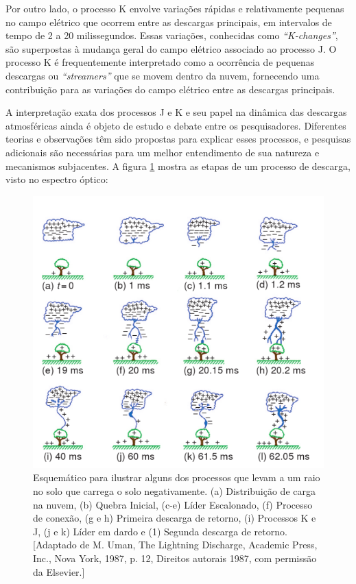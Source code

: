 \documentclass[a4paper, 12pt, onecolumn,singlespacing]{article}
\begin{document}
	Por outro lado, o processo K envolve variações rápidas e relativamente pequenas no campo elétrico que ocorrem entre as descargas principais, em intervalos de tempo de 2 a 20 milissegundos. Essas variações, conhecidas como \textit{``K-changes''}, são superpostas à mudança geral do campo elétrico associado ao processo J. O processo K é frequentemente interpretado como a ocorrência de pequenas descargas ou \textit{``streamers''} que se movem dentro da nuvem, fornecendo uma contribuição para as variações do campo elétrico entre as descargas principais.
	
	A interpretação exata dos processos J e K e seu papel na dinâmica das descargas atmosféricas ainda é objeto de estudo e debate entre os pesquisadores. Diferentes teorias e observações têm sido propostas para explicar esses processos, e pesquisas adicionais são necessárias para um melhor entendimento de sua natureza e mecanismos subjacentes.
	\pagebreak
	A figura \ref{lightning_process} mostra as etapas de um processo de descarga, visto no espectro óptico:
	
	\begin{figure}[h]
		\centering
		\includegraphics[width=\textwidth]{imagens/lightning_process.png}
		\caption{Esquemático para ilustrar alguns dos processos que levam a um raio no solo que carrega o solo negativamente. (a) Distribuição de carga na nuvem, (b) Quebra Inicial, (c-e) Líder Escalonado, (f) Processo de conexão, (g e h) Primeira descarga de retorno, (i) Processos K e J, (j e k) Líder em dardo e (1) Segunda descarga de retorno. [Adaptado de M. Uman, The Lightning Discharge, Academic Press, Inc., Nova York, 1987, p. 12, Direitos autorais 1987, com permissão da Elsevier.]}
		\label{lightning_process}
	\end{figure}
	
\end{document}
